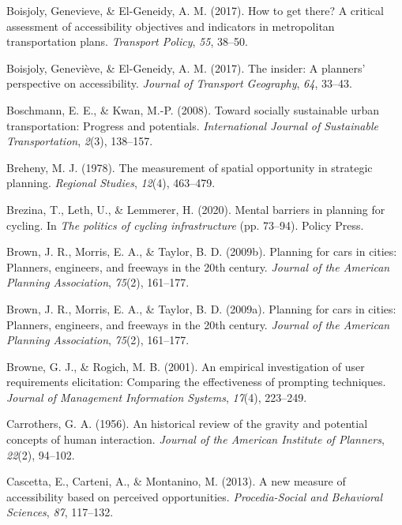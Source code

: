 \documentclass[
11pt, %
oneside, %
english, %
singlespacing, %
]{macthesis} %
\newlength{\cslhangindent}
\newenvironment{CSLReferences}[2] %
{\begin{list}{}{%
	\setlength{\itemindent}{0pt}
	\setlength{\leftmargin}{0pt}
	\setlength{\parsep}{0pt}
	\ifodd #1
	\setlength{\leftmargin}{\cslhangindent}
	\setlength{\itemindent}{-1\cslhangindent}
	\fi
	\setlength{\itemsep}{#2\baselineskip}}}
{\end{list}}
\begin{document}
\begin{CSLReferences}{1}{0}
Boisjoly, Genevieve, \& El-Geneidy, A. M. (2017). How to get there? A critical assessment of accessibility objectives and indicators in metropolitan transportation plans. \emph{Transport Policy}, \emph{55}, 38--50.

Boisjoly, Geneviève, \& El-Geneidy, A. M. (2017). The insider: A planners' perspective on accessibility. \emph{Journal of Transport Geography}, \emph{64}, 33--43.

Boschmann, E. E., \& Kwan, M.-P. (2008). Toward socially sustainable urban transportation: Progress and potentials. \emph{International Journal of Sustainable Transportation}, \emph{2}(3), 138--157.

Breheny, M. J. (1978). The measurement of spatial opportunity in strategic planning. \emph{Regional Studies}, \emph{12}(4), 463--479.

Brezina, T., Leth, U., \& Lemmerer, H. (2020). Mental barriers in planning for cycling. In \emph{The politics of cycling infrastructure} (pp. 73--94). Policy Press.

Brown, J. R., Morris, E. A., \& Taylor, B. D. (2009b). Planning for cars in cities: Planners, engineers, and freeways in the 20th century. \emph{Journal of the American Planning Association}, \emph{75}(2), 161--177.

Brown, J. R., Morris, E. A., \& Taylor, B. D. (2009a). Planning for cars in cities: Planners, engineers, and freeways in the 20th century. \emph{Journal of the American Planning Association}, \emph{75}(2), 161--177.

Browne, G. J., \& Rogich, M. B. (2001). An empirical investigation of user requirements elicitation: Comparing the effectiveness of prompting techniques. \emph{Journal of Management Information Systems}, \emph{17}(4), 223--249.

Carrothers, G. A. (1956). An historical review of the gravity and potential concepts of human interaction. \emph{Journal of the American Institute of Planners}, \emph{22}(2), 94--102.

Cascetta, E., Carteni, A., \& Montanino, M. (2013). A new measure of accessibility based on perceived opportunities. \emph{Procedia-Social and Behavioral Sciences}, \emph{87}, 117--132.


\end{CSLReferences}
\end{document}
